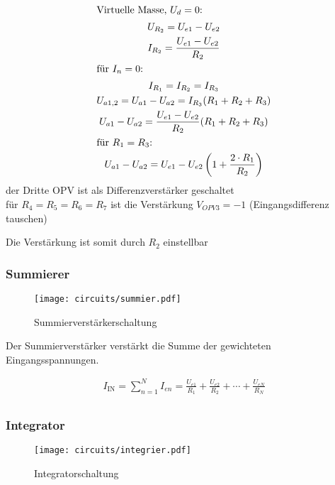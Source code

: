 \begin{gather*}
  \intertext{Virtuelle Masse, $U_d = 0$:}
  U_{R_2} = U_{e1} - U_{e2}\\
  I_{R_2} = \frac{U_{e1} - U_{e2}}{R_2}\\
  \intertext{für $I_n = 0$:}
  I_{R_1} = I_{R_2} = I_{R_3}\\
  U_{a1,2} = U_{a1} - U_{a2} = I_{R_3} (R_1 + R_2 + R_3)\\ 
  U_{a1} - U_{a2} = \frac{U_{e1}-U_{e2}}{R_2} (R_1 + R_2 + R_3)\\ 
  \intertext{für $R_1 = R_3$:}
  U_{a1} - U_{a2} = U_{e1} - U_{e2} \left( 1 + \frac{2 \cdot R_1}{R_2}\right)
\end{gather*}
  der Dritte OPV ist als Differenzverstärker geschaltet\\
  für $R_4 = R_5 = R_6 = R_7$ ist die Verstärkung $V_{OPV3} = -1$
    (Eingangsdifferenz tauschen)

Die Verstärkung ist somit durch $R_2$ einstellbar
\subsubsection{Summierer}

\begin{figure}[H]
  \begin{center}
    \texttt{[image: circuits/summier.pdf]}
  \end{center}
  \caption{Summierverstärkerschaltung}
\end{figure}

Der Summierverstärker verstärkt die Summe der gewichteten Eingangsspannungen.

\begin{gather*}
  I_{\mathrm{IN}} = \sum_{n=1}^N{I_{en}} = \frac{U_{e1}}{R_1}+
  \frac{U_{e2}}{R_2} + \cdots + \frac{U_{eN}}{R_N}\\
\end{gather*}

\subsubsection{Integrator}
\begin{figure}[H]
  \begin{center}
    \texttt{[image: circuits/integrier.pdf]}
  \end{center}
  \caption{Integratorschaltung}
\end{figure}

